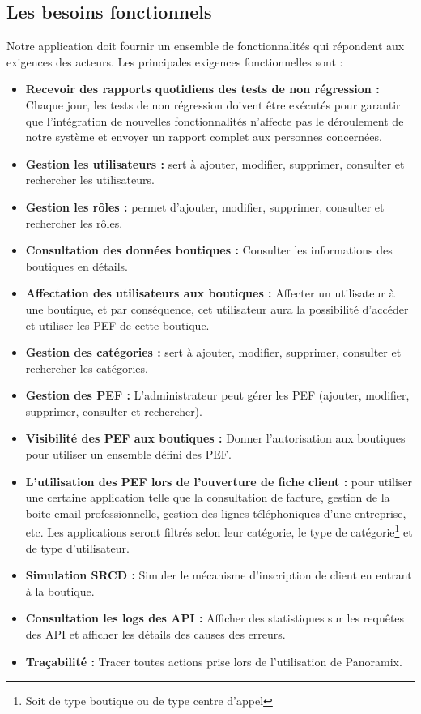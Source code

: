 \subsection[Les besoins fonctionnels]{Les besoins fonctionnels}
Notre application doit fournir un ensemble de fonctionnalités qui répondent aux exigences des acteurs. Les principales exigences fonctionnelles sont :
\begin{itemize}
	\item \textbf{Recevoir des rapports quotidiens des tests de non régression :} Chaque jour, les tests de non régression doivent être exécutés pour garantir que l'intégration de nouvelles fonctionnalités n'affecte pas le déroulement de notre système et envoyer un rapport complet aux personnes concernées.
	\item \textbf{Gestion les utilisateurs :} sert à ajouter, modifier, supprimer, consulter et rechercher les utilisateurs.
	\item \textbf{Gestion les rôles :} permet d'ajouter, modifier, supprimer, consulter et rechercher les rôles.
	\item \textbf{Consultation des données boutiques :} Consulter les informations des boutiques en détails.
	\item \textbf{Affectation des utilisateurs aux boutiques :} Affecter un utilisateur à une boutique, et par conséquence, cet utilisateur aura la possibilité d'accéder et utiliser les PEF de cette boutique. 
	\item \textbf{Gestion des catégories :} sert à ajouter, modifier, supprimer, consulter et rechercher les catégories.
	\item \textbf{Gestion des PEF :} L'administrateur peut gérer les PEF (ajouter, modifier, supprimer, consulter et rechercher).
	\item \textbf{Visibilité des PEF aux boutiques :} Donner l'autorisation aux boutiques pour utiliser un ensemble défini des PEF.
	\item \textbf{L’utilisation des PEF lors de l’ouverture de fiche client :} pour utiliser une certaine application telle que la consultation de facture, gestion de la boite email professionnelle, gestion des lignes téléphoniques d’une entreprise, etc. Les applications seront filtrés selon leur catégorie, le type de catégorie\footnote{Soit de type boutique ou de type centre d'appel} et de type d'utilisateur.
	\item \textbf{Simulation SRCD :} Simuler le mécanisme d'inscription de client en entrant à la boutique.
	\item \textbf{Consultation les logs des API :} Afficher des statistiques sur les requêtes des API et afficher les détails des causes des erreurs.
	\item \textbf{Traçabilité :} Tracer toutes actions prise lors de l'utilisation de Panoramix.
\end{itemize}

